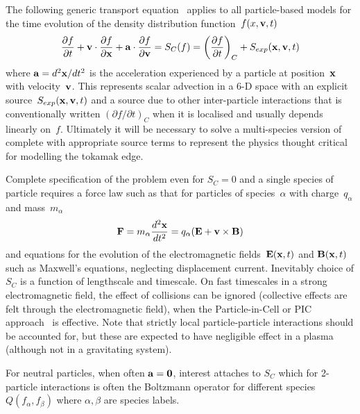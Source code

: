 The following generic transport equation~\cite[\S\,1]{duderstadtmartin} applies to
all particle-based models for the time
evolution of the density distribution function~$f (x,{\bf v},t)$
\begin{equation} \label{eq:transport}
\frac{\partial f}{\partial t}
+ {\bf v} \cdot \frac{\partial f}{\partial {\bf x}}
+ {\bf a} \cdot \frac{\partial f}{\partial {\bf v}} 
= S_C(f)
=\left(\frac{\partial f}{\partial t}\right)_C + S_{exp}({\bf x},{\bf v},t)
\end{equation}
where ${\bf a} = d^2 {\bf x}/dt^2$ is the acceleration experienced by a particle
at position~${\bf x}$ with velocity~${\bf v}$. This represents scalar
advection in a 6-D space with an explicit source~$S_{exp}({\bf x}, {\bf v},t)$
and a source due to other inter-particle interactions that is conventionally written
$(\partial f/\partial t)_C$ when it is localised and usually depends linearly on~$f$.
Ultimately it will be necessary to solve a multi-species version of 
complete with appropriate source terms to represent the physics thought critical for modelling the
tokamak edge.

Complete specification of the problem even for $S_C=0$ and a single species of particle
requires a force law such as that for particles of species~$\alpha$
with charge~$q_\alpha$ and mass~$m_\alpha$
\begin{equation}\label{eq:forcelaw}
{\bf F} = m_\alpha \frac{d^2 {\bf x}}{dt^2} = q_\alpha ({\bf E} + {\bf v} \times {\bf B})
\end{equation}
and equations for the evolution of the electromagnetic fields~${\bf E}({\bf x},t)$ 
and ${\bf B}({\bf x},t)$ such as Maxwell's equations, neglecting displacement current.
Inevitably choice of $S_C$ is a function of lengthscale and timescale.
On fast timescales in a strong electromagnetic field, the effect of collisions can
be ignored (collective effects are felt through the electromagnetic field),
when the Particle-in-Cell or PIC approach~\cite{hockneyeastwood} is effective.
Note that strictly local particle-particle interactions should be accounted for,
but these are expected to have negligible effect in a plasma (although not in
a gravitating system).

For neutral particles, when often ${\bf a}={\bf 0}$, interest attaches to $S_C$
which for 2-particle interactions is often the Boltzmann operator for 
different species $Q(f_\alpha, f_\beta)$ where $\alpha,\beta$ are species labels.


